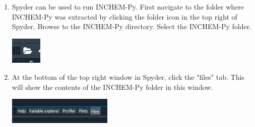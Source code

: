 \documentclass[a4paper]{refart}
\begin{document}
{\begin{minipage}{\fullwidth}
\begin{enumerate}
    \item Spyder can be used to run INCHEM-Py. First navigate to the folder where INCHEM-Py was extracted by clicking the folder icon in the top right of Spyder. Browse to the INCHEM-Py directory. Select the INCHEM-Py folder.

            \vspace{1em}
            \begin{minipage}[t]{\linewidth}
                \centering
                \includegraphics[width = 1.5cm]{folder.png}
            \end{minipage}

    \item At the bottom of the top right window in Spyder, click the "files" tab. This will show the contents of the INCHEM-Py folder in this window.

            \vspace{1em}
            \begin{minipage}[t]{\linewidth}
                \centering
                \includegraphics[width = 5cm]{files.png}
            \end{minipage}

\end{enumerate}
\end{minipage}}
\end{document}
